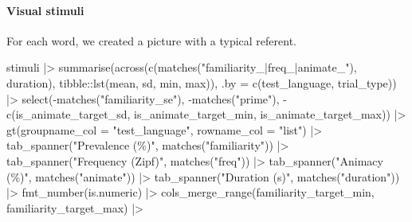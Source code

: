 \documentclass[
  letterpaper,
  DIV=11,
  numbers=noendperiod]{scrartcl}
\let\oldparagraph\paragraph
\renewcommand{\paragraph}[1]{\oldparagraph{#1}\mbox{}}
\newenvironment{Shaded}{\begin{snugshade}}{\end{snugshade}}
\newcommand{\AttributeTok}[1]{\textcolor[rgb]{0.40,0.45,0.13}{#1}}
\newcommand{\FunctionTok}[1]{\textcolor[rgb]{0.28,0.35,0.67}{#1}}
\newcommand{\NormalTok}[1]{\textcolor[rgb]{0.00,0.23,0.31}{#1}}
\newcommand{\SpecialCharTok}[1]{\textcolor[rgb]{0.37,0.37,0.37}{#1}}
\newcommand{\StringTok}[1]{\textcolor[rgb]{0.13,0.47,0.30}{#1}}
\begin{document}
\hypertarget{visual-stimuli}{%
\paragraph{Visual stimuli}\label{visual-stimuli}}

For each word, we created a picture with a typical referent.

\begin{Shaded}
\begin{Highlighting}[]
\NormalTok{stimuli }\SpecialCharTok{|\textgreater{}} 
    \FunctionTok{summarise}\NormalTok{(}\FunctionTok{across}\NormalTok{(}\FunctionTok{c}\NormalTok{(}\FunctionTok{matches}\NormalTok{(}\StringTok{"familiarity\_|freq\_|animate\_"}\NormalTok{), duration),}
\NormalTok{                     tibble}\SpecialCharTok{::}\FunctionTok{lst}\NormalTok{(mean, sd, min, max)),}
              \AttributeTok{.by =} \FunctionTok{c}\NormalTok{(test\_language, trial\_type)) }\SpecialCharTok{|\textgreater{}} 
    \FunctionTok{select}\NormalTok{(}\SpecialCharTok{{-}}\FunctionTok{matches}\NormalTok{(}\StringTok{"familiarity\_se"}\NormalTok{), }\SpecialCharTok{{-}}\FunctionTok{matches}\NormalTok{(}\StringTok{"prime"}\NormalTok{),}
           \SpecialCharTok{{-}}\FunctionTok{c}\NormalTok{(is\_animate\_target\_sd,}
\NormalTok{              is\_animate\_target\_min,}
\NormalTok{              is\_animate\_target\_max)) }\SpecialCharTok{|\textgreater{}} 
    \FunctionTok{gt}\NormalTok{(}\AttributeTok{groupname\_col =} \StringTok{"test\_language"}\NormalTok{,}
       \AttributeTok{rowname\_col =} \StringTok{"list"}\NormalTok{) }\SpecialCharTok{|\textgreater{}} 
    \FunctionTok{tab\_spanner}\NormalTok{(}\StringTok{"Prevalence (\%)"}\NormalTok{, }\FunctionTok{matches}\NormalTok{(}\StringTok{"familiarity"}\NormalTok{)) }\SpecialCharTok{|\textgreater{}} 
    \FunctionTok{tab\_spanner}\NormalTok{(}\StringTok{"Frequency (Zipf)"}\NormalTok{, }\FunctionTok{matches}\NormalTok{(}\StringTok{"freq"}\NormalTok{)) }\SpecialCharTok{|\textgreater{}}
    \FunctionTok{tab\_spanner}\NormalTok{(}\StringTok{"Animacy (\%)"}\NormalTok{, }\FunctionTok{matches}\NormalTok{(}\StringTok{"animate"}\NormalTok{)) }\SpecialCharTok{|\textgreater{}} 
    \FunctionTok{tab\_spanner}\NormalTok{(}\StringTok{"Duration (s)"}\NormalTok{, }\FunctionTok{matches}\NormalTok{(}\StringTok{"duration"}\NormalTok{)) }\SpecialCharTok{|\textgreater{}} 
    \FunctionTok{fmt\_number}\NormalTok{(is.numeric) }\SpecialCharTok{|\textgreater{}} 
    \FunctionTok{cols\_merge\_range}\NormalTok{(familiarity\_target\_min, familiarity\_target\_max) }\SpecialCharTok{|\textgreater{}} 

\end{Highlighting}
\end{Shaded}
\end{document}
